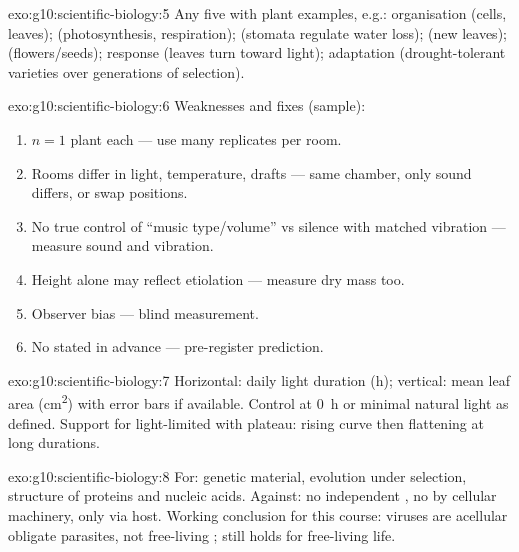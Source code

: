 \begin{solution}{exo:g10:scientific-biology:5}
Any five with plant examples, e.g.: organisation (cells, leaves);
 (photosynthesis, respiration);  (stomata regulate
water loss);  (new leaves);  (flowers/seeds); response
(leaves turn toward light); adaptation (drought-tolerant varieties over
generations of selection).
\end{solution}

\begin{solution}{exo:g10:scientific-biology:6}
Weaknesses and fixes (sample):
\begin{enumerate}
  \item $n=1$ plant each --- use many replicates per room.
  \item Rooms differ in light, temperature, drafts --- same chamber,
        only sound differs, or swap positions.
  \item No true control of ``music type/volume'' vs silence with matched
        vibration --- measure sound and vibration.
  \item Height alone may reflect etiolation --- measure dry mass too.
  \item Observer bias --- blind measurement.
  \item No  stated in advance --- pre-register prediction.
\end{enumerate}
\end{solution}

\begin{solution}{exo:g10:scientific-biology:7}
Horizontal: daily light duration (\unit{h}); vertical: mean leaf area
(\unit{cm^2}) with error bars if available. Control at \qty{0}{h} or
minimal natural light as defined. Support for light-limited  with
plateau: rising curve then flattening at long durations.
\end{solution}

\begin{solution}{exo:g10:scientific-biology:8}
For: genetic material, evolution under selection, structure of proteins
and nucleic acids. Against: no independent , no  by
cellular machinery,  only via host. Working conclusion for
this course: viruses are acellular obligate parasites, not free-living
;  still holds for free-living life.
\end{solution}

